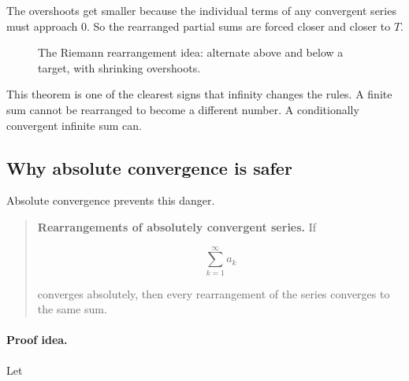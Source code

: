 The overshoots get smaller because the individual terms of any convergent series must
approach \(0\).  So the rearranged partial sums are forced closer and closer to \(T\).

\begin{figure}[h]
\centering
{}
\caption{The Riemann rearrangement idea: alternate above and below a target, with shrinking overshoots.}
\label{fig:riemann-rearrangement-idea}
\end{figure}

This theorem is one of the clearest signs that infinity changes the rules.  A finite sum
cannot be rearranged to become a different number.  A conditionally convergent infinite
sum can.

\subsection{Why absolute convergence is safer}
\label{subsec:why-absolute-convergence-safer}

Absolute convergence prevents this danger.

\begin{quote}
\textbf{Rearrangements of absolutely convergent series.}
If

\[
\sum_{k=1}^{\infty}a_k
\]

converges absolutely, then every rearrangement of the series converges to the same sum.
\end{quote}

\paragraph{Proof idea.}
Let

